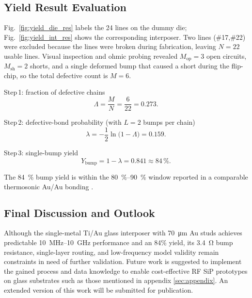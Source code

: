 \documentclass[conference]{IEEEtran}
\begin{document}
\subsection{Yield Result Evaluation}\label{subsec:yield_res}

Fig.~\ref{fig:yield_die_res} labels the 24 lines on the
dummy die; Fig.~\ref{fig:yield_int_res} shows the corresponding
interposer.  
Two lines (\#17,\#22) were excluded because the lines were broken during fabrication, leaving \(N=22\) usable lines.  
Visual inspection and ohmic probing revealed
\(M_{\text{op}}=3\) open circuits,
\(M_{\text{sh}}=2\) shorts, and a single deformed bump that caused a short during the flip-chip, so the total defective count is \(M=6\).

Step\,1: fraction of defective chains
\begin{equation}
\Lambda = \frac{M}{N}= \frac{6}{22}=0.273.
\label{eq:lambda_meas}
\end{equation}

Step\,2: defective-bond probability
(with \(L=2\) bumps per chain)
\begin{equation}
\lambda = -\frac{1}{2}\ln\!\bigl(1-\Lambda\bigr)=0.159.
\label{eq:lambda_calc}
\end{equation}

Step\,3: single-bump yield
\begin{equation}
Y_{\text{bump}} = 1-\lambda = 0.841 \approx 84\,\%.
\label{eq:yield_84}
\end{equation}

The \SI{84}{\percent} bump yield is within the
\SIrange{80}{90}{\percent} window reported in a comparable thermosonic Au/Au bonding \cite{Ullan2004}.

\subsection{Final Discussion and Outlook}\label{subsec:final_discussion}
Although the single-metal Ti/Au glass interposer with \SI{70}{\micro\metre} Au studs achieves predictable \SI{10}{\mega\hertz}–\SI{10}{\giga\hertz} performance and an 84\% yield, its \SI{3.4}{\ohm} bump resistance, single-layer routing, and low-frequency model validity remain constraints in need of further validation. Future work is suggested to implement the gained process and data knowledge to enable cost-effective RF SiP prototypes on glass substrates such as those mentioned in appendix \ref{sec:appendix}. An extended version of this work will be submitted for publication.
\end{document}
